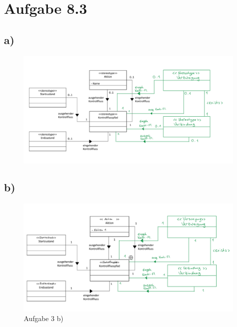 \documentclass{article}
\begin{document}
	
	\newpage	
	\section*{Aufgabe 8.3}
		\subsection*{a)}
			\begin{figure}
				\includegraphics[width=\linewidth]{exercise_8_3_a.png}
				\label{fig:exercise_8_3_a.png}
			\end{figure}
		
		
		
		\newpage
		\subsection*{b)}
			\begin{figure}
				\includegraphics[width=\linewidth]{exercise_8_3_b.png}
				\caption{Aufgabe 3 b)}
				\label{fig:exercise_8_3_b.png}
			\end{figure}
		
\end{document}
